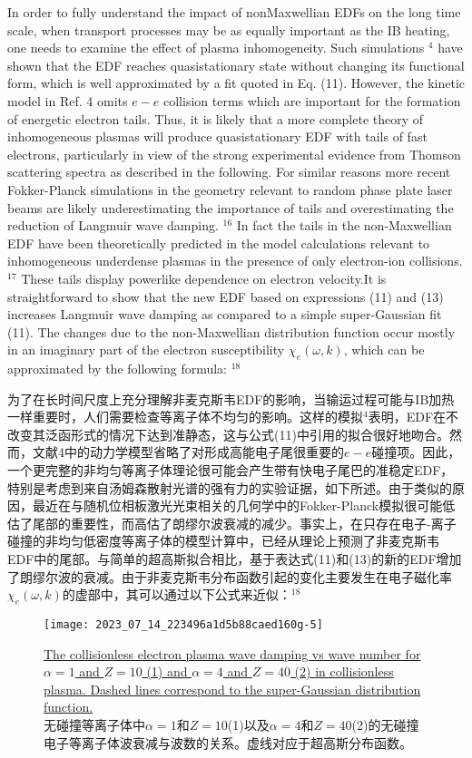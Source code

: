\documentclass[oneside,onecolumn]{article}
\newcommand\enzhbox[2]{
	\quad\par \begin{paracol}{2} 
			\begin{spacing}{1.0}
					\footnotesize  #1
			\end{spacing}
			
		\switchcolumn[1] 
		#2
	\end{paracol} 
}
\begin{document}
\begin{sloppypar}
\enzhbox{  In order to fully understand the impact of nonMaxwellian EDFs on the long time scale, when transport processes may be as equally important as the IB heating, one needs to examine the effect of plasma inhomogeneity. Such simulations $^{4}$ have shown that the EDF reaches quasistationary state without changing its functional form, which is well approximated by a fit quoted in Eq. (11). However, the kinetic model in Ref. 4 omits $e-e$ collision terms which are important for the formation of energetic electron tails. Thus, it is likely that a more complete theory of inhomogeneous plasmas will produce quasistationary EDF with tails of fast electrons, particularly in view of the strong experimental evidence from Thomson scattering spectra as described in the following. For similar reasons more recent Fokker-Planck simulations in the geometry relevant to random phase plate laser beams are likely underestimating the importance of tails and overestimating the reduction of Langmuir wave damping. ${ }^{16}$ In fact the tails in the non-Maxwellian EDF have been theoretically predicted in the model calculations relevant to inhomogeneous underdense plasmas in the presence of only electron-ion collisions. ${ }^{17}$ These tails display powerlike dependence on electron velocity.It is straightforward to show that the new EDF based on expressions (11) and (13) increases Langmuir wave damping as compared to a simple super-Gaussian fit (11). The changes due to the non-Maxwellian distribution function occur mostly in an imaginary part of the electron susceptibility $\chi_{e}(\omega, k)$, which can be approximated by the following formula: ${ }^{18}$
}{
为了在长时间尺度上充分理解非麦克斯韦EDF的影响，当输运过程可能与IB加热一样重要时，人们需要检查等离子体不均匀的影响。这样的模拟$^{4}$表明，EDF在不改变其泛函形式的情况下达到准静态，这与公式(11)中引用的拟合很好地吻合。然而，文献4中的动力学模型省略了对形成高能电子尾很重要的$e-e$碰撞项。因此，一个更完整的非均匀等离子体理论很可能会产生带有快电子尾巴的准稳定EDF，特别是考虑到来自汤姆森散射光谱的强有力的实验证据，如下所述。由于类似的原因，最近在与随机位相板激光光束相关的几何学中的Fokker-Planck模拟很可能低估了尾部的重要性，而高估了朗缪尔波衰减的减少。事实上，在只存在电子-离子碰撞的非均匀低密度等离子体的模型计算中，已经从理论上预测了非麦克斯韦EDF中的尾部。与简单的超高斯拟合相比，基于表达式(11)和(13)的新的EDF增加了朗缪尔波的衰减。由于非麦克斯韦分布函数引起的变化主要发生在电子磁化率$\chi_{e}(\omega, k)$的虚部中，其可以通过以下公式来近似：${ }^{18}$
}
  
  \begin{figure}[tbp]
  	\centering
  	\texttt{[image: 2023\_07\_14\_223496a1d5b88caed160g-5]}
  	\caption{\uline{The collisionless electron plasma wave damping vs wave number for $\alpha=1$ and $Z=10$ (1) and $\alpha=4$ and $Z=40$ (2) in collisionless plasma. Dashed lines correspond to the super-Gaussian distribution function.}\\无碰撞等离子体中$\alpha=1$和$Z=10$(1)以及$\alpha=4$和$Z=40$(2)的无碰撞电子等离子体波衰减与波数的关系。虚线对应于超高斯分布函数。}
  	\label{figure5}
  \end{figure}
  

\end{sloppypar}
\end{document}

